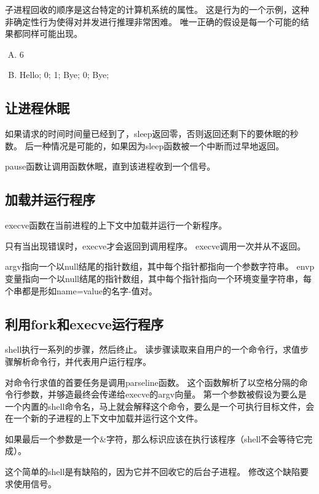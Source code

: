 {{{            子进程回收的顺序是这台特定的计算机系统的属性。
            这是行为的一个示例，这种非确定性行为使得对并发进行推理非常困难。
            唯一正确的假设是每一个可能的结果都同样可能出现。

            \begin{practicec}
                \begin{enumerate}[A.]
                    \item 6
                    \item
                    {
                        Hello;
                        0;
                        1;
                        Bye;
                        0;
                        Bye;
                    }
                \end{enumerate}
            \end{practicec}
        }
    }

    \subsection{让进程休眠}
    {
        如果请求的时间时间量已经到了，sleep返回零，否则返回还剩下的要休眠的秒数。
        后一种情况是可能的，如果因为sleep函数被一个中断而过早地返回。

        pause函数让调用函数休眠，直到该进程收到一个信号。
    }

    \subsection{加载并运行程序}
    {
        execve函数在当前进程的上下文中加载并运行一个新程序。

        只有当出现错误时，execve才会返回到调用程序。
        execve调用一次并从不返回。

        argv指向一个以null结尾的指针数组，其中每个指针都指向一个参数字符串。
        envp变量指向一个以null结尾的指针数组，其中每个指针指向一个环境变量字符串，每个串都是形如name=value的名字-值对。
    }

    \subsection{利用fork和execve运行程序}
    {
        shell执行一系列的步骤，然后终止。
        读步骤读取来自用户的一个命令行，求值步骤解析命令行，并代表用户运行程序。

        对命令行求值的首要任务是调用parseline函数。
        这个函数解析了以空格分隔的命令行参数，并够造最终会传递给execve的argv向量。
        第一个参数被假设为要么是一个内置的shell命令名，马上就会解释这个命令，要么是一个可执行目标文件，会在一个新的子进程的上下文中加载并运行这个文件。

        如果最后一个参数是一个\&字符，那么标识应该在执行该程序（shell不会等待它完成）。

        这个简单的shell是有缺陷的，因为它并不回收它的后台子进程。
        修改这个缺陷要求使用信号。
    }
}
